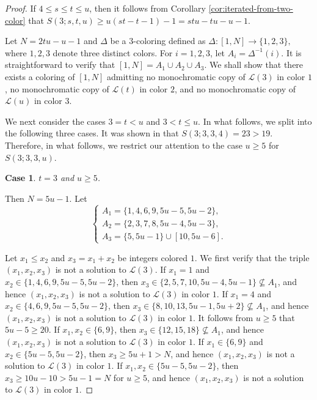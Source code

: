 \documentclass[twoside, 12pt]{article}
\newtheorem{case}{Case}
\begin{document}
\begin{proof}
If $4 \leq s \leq t \leq u$, then it follows from Corollary \ref{cor:iterated-from-two-color} that
$S(3;s,t,u) \geq u (st-t-1) -1=stu-tu-u-1.$

Let $N=2tu-u-1$ and $\Delta$ be a $3$-coloring defined as
$\Delta : \left[1, N\right] \to \{1,2,3\},$
where $1,2,3$ denote three distinct colors. For $i = 1,2,3$, let $A_i = \Delta^{-1}(i)$. It is straightforward to verify that $\left[1, N\right] = A_1 \cup A_2  \cup A_3.$ We shall show that there exists a coloring of $[1,N]$ admitting no monochromatic copy of $\mathcal{L}(3)$ in color $1$, no monochromatic copy of $\mathcal{L}(t)$ in color $2$, and no monochromatic copy of $\mathcal{L}(u)$ in color $3$.

We next consider the cases $3 = t < u$ and $3 < t \leq u$. In what follows, we split into the following three cases. It was shown in \cite{AhSc16} that \(S(3;3,3,4)=23>19\). Therefore, in what follows, we restrict our attention to the case \(u \geq 5\) for \(S(3;3,3,u)\).


\begin{case}
$t=3$ and $u \geq 5$.
\end{case}

Then $N=5u-1$. Let
\begin{equation*}
\begin{cases}
A_1 =\{1,4,6,9,5u-5,5u-2\}, \\
A_2 =\{2,3,7,8,5u-4,5u-3\}, \\
A_3 =\{5,5u-1\} \cup [10,5u-6].
\end{cases}
\end{equation*}

Let \(x_1 \leq x_2 \) and $x_3=x_1+x_2$ be integers colored \(1\). We first verify that the triple \((x_1,x_2,x_3)\) is not a solution to \(\mathcal{L}(3)\).
If $x_1=1$ and $x_2 \in \{1,4,6,9,5u-5,5u-2\}$, then $x_3 \in \{2,5,7,10,5u-4,5u-1\}
\nsubseteq A_1$, and hence $(x_1, x_2, x_3 )$ is not a solution to \(\mathcal{L}(3)\) in color $1$.
If $x_1=4$ and $x_2 \in \{4,6,9,5u-5,5u-2\}$, then $x_3 \in \{8,10,13, 5u-1,5u+2\} \nsubseteq A_1$, and hence $(x_1, x_2, x_3 )$ is not a solution to \(\mathcal{L}(3)\) in color $1$.
It follows from \(u \geq 5\) that \(5u-5 \geq 20\).
If $x_1, x_2 \in \{6,9\}$, then $x_3 \in \{12,15,18\} \nsubseteq A_1$, and hence $(x_1, x_2, x_3 )$ is not a solution to \(\mathcal{L}(3)\) in color $1$. If $x_1 \in \{6,9\}$ and $x_2 \in \{5u-5,5u-2\}$, then $x_3 \geq 5u+1 >N$, and hence $(x_1, x_2, x_3 )$ is not a solution to \(\mathcal{L}(3)\) in color $1$. If $x_1, x_2 \in \{5u-5,5u-2\}$, then $x_3 \geq 10u-10 > 5u-1=N$ for $u \geq 5$, and hence $(x_1, x_2, x_3 )$ is not a solution to \(\mathcal{L}(3)\) in color $1$.



\end{proof}
\end{document}

